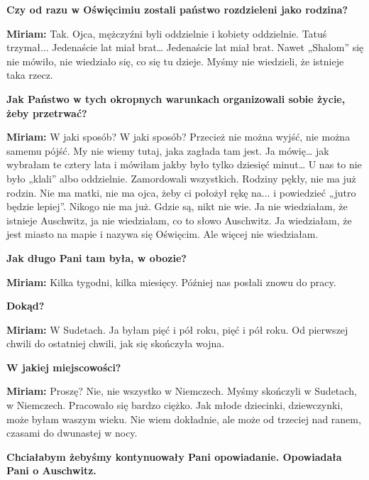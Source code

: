 \textbf{Czy od razu w Oświęcimiu zostali państwo rozdzieleni jako rodzina?} 

\textbf{Miriam:} Tak. Ojca, mężczyźni byli oddzielnie i kobiety oddzielnie. Tatuś trzymał... Jedenaście lat miał brat… Jedenaście lat miał brat. Nawet „Shalom” się nie mówiło, nie wiedziało się, co się tu dzieje. Myśmy nie wiedzieli, że istnieje taka rzecz. 

\textbf{Jak Państwo w tych okropnych warunkach organizowali sobie życie, żeby przetrwać?} 

\textbf{Miriam:} W jaki sposób? W jaki sposób? Przecież nie można wyjść, nie można samemu pójść. My nie wiemy tutaj, jaka zagłada tam jest. Ja mówię… jak wybrałam te cztery lata i mówiłam jakby było tylko dziesięć minut… U nas to nie było „klali” albo oddzielnie. Zamordowali wszystkich. Rodziny pękły, nie ma już rodzin. Nie ma matki, nie ma ojca, żeby ci położył rękę na... i powiedzieć „jutro będzie lepiej”. Nikogo nie ma już. Gdzie są, nikt nie wie. Ja nie wiedziałam, że istnieje Auschwitz, ja nie wiedziałam, co to słowo Auschwitz. Ja wiedziałam, że jest miasto na mapie i nazywa się Oświęcim. Ale więcej nie wiedziałam. 

\textbf{Jak długo Pani tam była, w obozie?} 

\textbf{Miriam:} Kilka tygodni, kilka miesięcy. Później nas posłali znowu do pracy. 

\textbf{Dokąd?} 

\textbf{Miriam:} W Sudetach. Ja byłam pięć i pół roku, pięć i pół roku. Od pierwszej chwili do ostatniej chwili, jak się skończyła wojna. 

\textbf{W jakiej miejscowości?} 

\textbf{Miriam:} Proszę? Nie, nie wszystko w Niemczech. Myśmy skończyli w Sudetach, w Niemczech. Pracowało się bardzo ciężko. Jak młode dziecinki, dziewczynki, może byłam waszym wieku. Nie wiem dokładnie, ale może od trzeciej nad ranem, czasami do dwunastej w nocy. 

\textbf{Chciałabym żebyśmy kontynuowały Pani opowiadanie. Opowiadała Pani o Auschwitz.}

